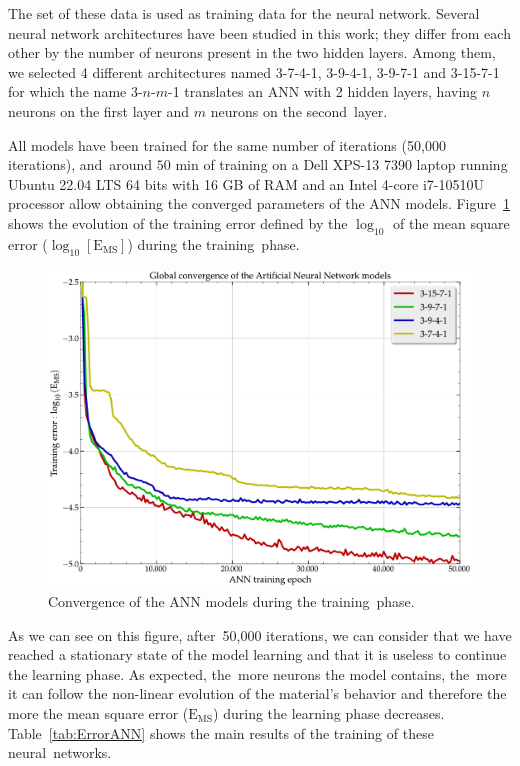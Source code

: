 \documentclass[algorithms,article,accept,pdftex,moreauthors]{Definitions/mdpi}
\DeclareRobustCommand{\MSE}{\text{E}_\text{MS}}
\begin{document}
The set of these data is used as training data for the neural network.
Several neural network architectures have been studied in this work; they differ from each other by the number of neurons present in the two hidden layers.
Among them, we selected 4 different architectures named 3-7-4-1, 3-9-4-1, 3-9-7-1 and 3-15-7-1 for which the name 3-$n$-$m$-1 translates an ANN with 2 hidden layers, having $n$ neurons on the first layer and $m$ neurons on the second~layer.

All models have been trained for the same number of iterations (50,000 iterations), and~around $50$ min of training on a Dell XPS-13 7390 laptop running Ubuntu 22.04 LTS 64 bits with 16 GB of RAM and an Intel 4-core i7-10510U processor allow obtaining the converged parameters of the ANN models.
Figure~\ref{fig:Convergence-ANN} shows the evolution of the training error defined by the $\log_{10}$ of the mean square error ($\log_{10}\left[\MSE\right]$) during the training~phase.
\begin{figure}[H]
\includegraphics[width=0.65\columnwidth]{Figures/Convergence-ANN}
\caption{Convergence of the ANN models during the training~phase.}
\label{fig:Convergence-ANN}
\end{figure}
As we can see on this figure, after~50,000 iterations, we can consider that we have reached a stationary state of the model learning and that it is useless to continue the learning phase.
As expected, the~more neurons the model contains, the~more it can follow the non-linear evolution of the material’s behavior and therefore the more the mean square error ($\MSE$) during the learning phase decreases.
Table~\ref{tab:ErrorANN} shows the main results of the training of these neural~networks.
\end{document}
